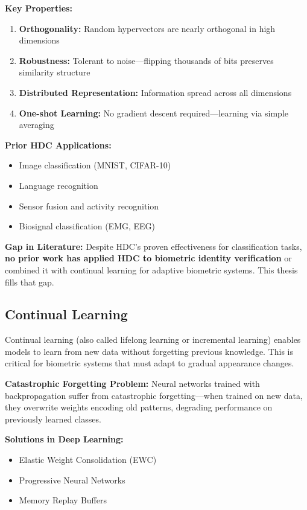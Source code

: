 \documentclass[a4paper,12pt]{article}
\begin{document}
\textbf{Key Properties:}
\begin{enumerate}
    \item \textbf{Orthogonality:} Random hypervectors are nearly orthogonal in high dimensions
    \item \textbf{Robustness:} Tolerant to noise—flipping thousands of bits preserves similarity structure
    \item \textbf{Distributed Representation:} Information spread across all dimensions
    \item \textbf{One-shot Learning:} No gradient descent required—learning via simple averaging
\end{enumerate}

\textbf{Prior HDC Applications:}
\begin{itemize}
    \item Image classification (MNIST, CIFAR-10)
    \item Language recognition
    \item Sensor fusion and activity recognition
    \item Biosignal classification (EMG, EEG)
\end{itemize}

\textbf{Gap in Literature:} Despite HDC's proven effectiveness for classification tasks, \textbf{no prior work has applied HDC to biometric identity verification} or combined it with continual learning for adaptive biometric systems. This thesis fills that gap.

\subsection{Continual Learning}

Continual learning (also called lifelong learning or incremental learning) enables models to learn from new data without forgetting previous knowledge. This is critical for biometric systems that must adapt to gradual appearance changes.

\textbf{Catastrophic Forgetting Problem:} Neural networks trained with backpropagation suffer from catastrophic forgetting—when trained on new data, they overwrite weights encoding old patterns, degrading performance on previously learned classes.

\textbf{Solutions in Deep Learning:}
\begin{itemize}
    \item Elastic Weight Consolidation (EWC)
    \item Progressive Neural Networks  
    \item Memory Replay Buffers
\end{itemize}
\end{document}
